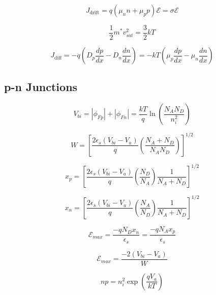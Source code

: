 \documentclass{infosheet}
\begin{document}
\begin{displaymath}
  J_\text{drift} = q(\mu_nn + \mu_pp)\mathcal{E} = \sigma\mathcal{E}
\end{displaymath}

\begin{displaymath}
  \frac{1}{2}m^*v_{sat}^2 = \frac{3}{2}kT
\end{displaymath}

\begin{displaymath}
  J_\text{diff} = -q\left(D_p\frac{dp}{dx} - D_n\frac{dn}{dx}\right) = -kT\left(\mu_p\frac{dp}{dx} - \mu_n\frac{dn}{dx}\right)
\end{displaymath}

\subsection{p-n Junctions}

\begin{displaymath}
  V_{bi} = |\phi_{Fp}| + |\phi_{Fn}| = \frac{kT}{q}\ln\left(\frac{N_AN_D}{n_i^2}\right)
\end{displaymath}

\begin{displaymath}
  W = \left[\frac{2\epsilon_s(V_{bi}-V_a)}{q}\left(\frac{N_A + N_D}{N_AN_D}\right)\right]^{1/2}
\end{displaymath}

\begin{displaymath}
  x_p = \left[\frac{2\epsilon_s(V_{bi}-V_a)}{q}\left(\frac{N_D}{N_A}\right)\frac{1}{N_A+N_D}\right]^{1/2}
\end{displaymath}

\begin{displaymath}
  x_n = \left[\frac{2\epsilon_s(V_{bi}-V_a)}{q}\left(\frac{N_A}{N_D}\right)\frac{1}{N_A+N_D}\right]^{1/2}
\end{displaymath}

\begin{displaymath}
  \mathcal{E}_{max} = \frac{-qN_Dx_n}{\epsilon_s} = \frac{-qN_Ax_p}{\epsilon_s}
\end{displaymath}

\begin{displaymath}
  \mathcal{E}_{max} = \frac{-2(V_{bi} - V_a)}{W}
\end{displaymath}

\begin{displaymath}
  np=n_i^2\exp\left(\frac{qV_a}{kT}\right)
\end{displaymath}
\end{document}
